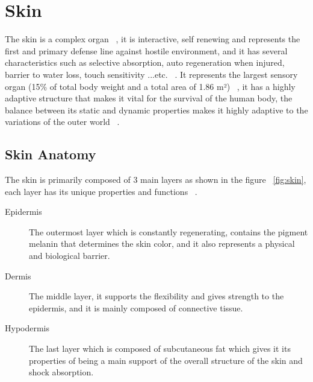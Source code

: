 \section{Skin}
The skin is a complex organ  ~\cite{elin2018}, it is interactive, self renewing and represents the first and primary defense line against hostile environment, and it has several characteristics such as selective absorption, auto regeneration when injured, barrier to water loss, touch sensitivity ...etc. ~\cite{joseph2020}. It represents the largest sensory organ (15\% of total body weight and a total area of 1.86 m²) ~\cite{sarah2021}, it has a highly adaptive structure that makes it vital for the survival of the human body, the balance between its static and dynamic properties makes it highly adaptive to the variations of the outer world ~\cite{eliana2022}.

\subsection{Skin Anatomy}
The skin is primarily composed of 3 main layers as shown in the figure ~\ref{fig:skin}, each layer has its unique properties and functions ~\cite{sarah2021}.
\begin{description}
\item[Epidermis] The outermost layer which is constantly regenerating, contains the pigment melanin that determines the skin color, and it also represents a physical and biological barrier.
\item[Dermis] The middle layer, it supports the flexibility and gives strength to the epidermis, and it is mainly composed of connective tissue.
\item[Hypodermis] The last layer which is composed of subcutaneous fat which gives it its properties of being a main support of the overall structure of the skin and shock absorption.
\end{description}


